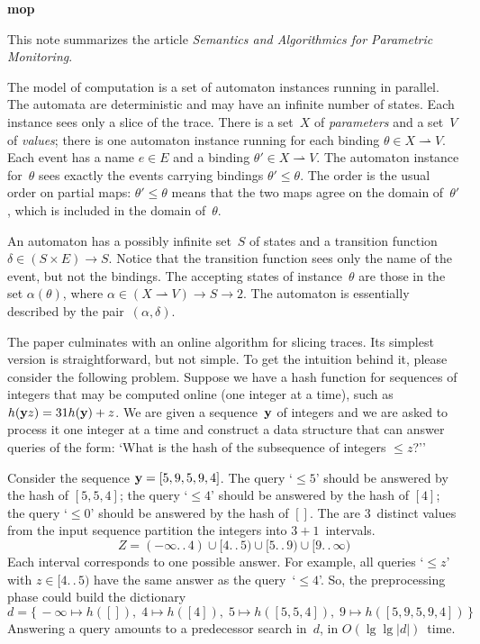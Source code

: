 \def\pmap{\rightharpoonup}
\centerline{\bf mop}

\medskip\noindent This note summarizes the article {\it Semantics and Algorithmics for Parametric Monitoring\/}.
\medskip

The model of computation is a set of automaton instances running in parallel.
The automata are deterministic and may have an infinite number of states.
Each instance sees only a slice of the trace.
There is a set~$X$ of {\it parameters\/} and a set~$V$ of {\it values\/}; there is one automaton instance running for each binding $\theta\in X\pmap V$.
Each event has a name $e\in E$ and a binding $\theta'\in X\pmap V$.
The automaton instance for~$\theta$ sees exactly the events carrying bindings $\theta'\le\theta$.
The order is the usual order on partial maps:
$\theta'\le\theta$ means that the two maps agree on the domain of~$\theta'$, which is included in the domain of~$\theta$.

An automaton has a possibly infinite set~$S$ of states and a transition function $\delta\in(S\times E)\to S$.
Notice that the transition function sees only the name of the event, but not the bindings.
The accepting states of instance~$\theta$ are those in the set $\alpha(\theta)$, where $\alpha\in(X\pmap V)\to S\to 2$.
The automaton is essentially described by the pair~$(\alpha,\delta)$.

The paper culminates with an online algorithm for slicing traces.
Its simplest version is straightforward, but not simple.
To get the intuition behind it, please consider the following problem.
Suppose we have a hash function for sequences of integers that may be computed online (one integer at a time), such as $h({\bf y}z)=31h({\bf y})+z$.
We are given a sequence~${\bf y}$ of integers and we are asked to process it one integer at a time and construct a data structure that can answer queries of the form:
`What is the hash of the subsequence of integers $\le z$?''

\medskip

Consider the sequence ${\bf y}=[5,9,5,9,4]$.
The query `$\le5$' should be answered by the hash of $[5,5,4]$;
the query `$\le4$' should be answered by the hash of $[4]$;
the query `$\le0$' should be answered by the hash of $[]$.
The are $3$~distinct values from the input sequence partition the integers into $3+1$~intervals.
$$Z=(-\infty.\,.\,4)\cup[4.\,.\,5)\cup[5.\,.\,9)\cup[9.\,.\,\infty)$$
Each interval corresponds to one possible answer.
For example, all queries `$\le z$' with $z\in[4.\,.\,5)$ have the same answer as the query~`$\le4$'.
So, the preprocessing phase could build the dictionary
$$d=\{\,
-\infty\mapsto h([]),\;
4\mapsto h([4]),\;
5\mapsto h([5,5,4]),\;
9\mapsto h([5,9,5,9,4])
\,\}$$
Answering a query amounts to a predecessor search in~$d$, in $O(\lg\lg|d|)$~time.

